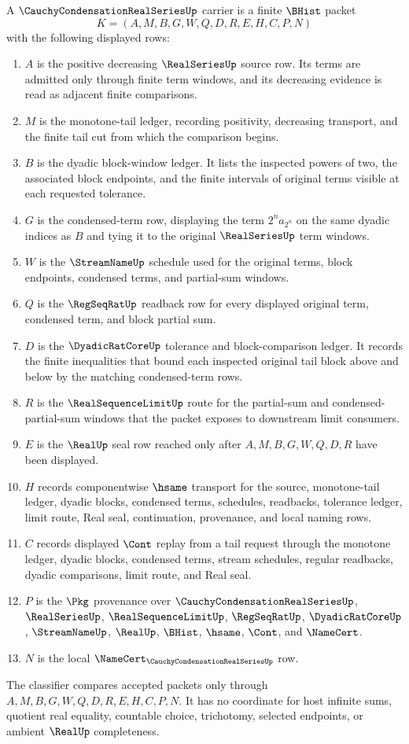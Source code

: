 \begin{definition}
\label{def:cauchy-condensation-real-series-carrier}
A $\CauchyCondensationRealSeriesUp$ carrier is a finite $\BHist$ packet
$$
K=(A,M,B,G,W,Q,D,R,E,H,C,P,N)
$$
with the following displayed rows:
\begin{enumerate}
\item $A$ is the positive decreasing $\RealSeriesUp$ source row. Its terms are admitted only through finite term windows, and its decreasing evidence is read as adjacent finite comparisons.
\item $M$ is the monotone-tail ledger, recording positivity, decreasing transport, and the finite tail cut from which the comparison begins.
\item $B$ is the dyadic block-window ledger. It lists the inspected powers of two, the associated block endpoints, and the finite intervals of original terms visible at each requested tolerance.
\item $G$ is the condensed-term row, displaying the term $2^n a_{2^n}$ on the same dyadic indices as $B$ and tying it to the original $\RealSeriesUp$ term windows.
\item $W$ is the $\StreamNameUp$ schedule used for the original terms, block endpoints, condensed terms, and partial-sum windows.
\item $Q$ is the $\RegSeqRatUp$ readback row for every displayed original term, condensed term, and block partial sum.
\item $D$ is the $\DyadicRatCoreUp$ tolerance and block-comparison ledger. It records the finite inequalities that bound each inspected original tail block above and below by the matching condensed-term rows.
\item $R$ is the $\RealSequenceLimitUp$ route for the partial-sum and condensed-partial-sum windows that the packet exposes to downstream limit consumers.
\item $E$ is the $\RealUp$ seal row reached only after $A,M,B,G,W,Q,D,R$ have been displayed.
\item $H$ records componentwise $\hsame$ transport for the source, monotone-tail ledger, dyadic blocks, condensed terms, schedules, readbacks, tolerance ledger, limit route, Real seal, continuation, provenance, and local naming rows.
\item $C$ records displayed $\Cont$ replay from a tail request through the monotone ledger, dyadic blocks, condensed terms, stream schedules, regular readbacks, dyadic comparisons, limit route, and Real seal.
\item $P$ is the $\Pkg$ provenance over $\CauchyCondensationRealSeriesUp$, $\RealSeriesUp$, $\RealSequenceLimitUp$, $\RegSeqRatUp$, $\DyadicRatCoreUp$, $\StreamNameUp$, $\RealUp$, $\BHist$, $\hsame$, $\Cont$, and $\NameCert$.
\item $N$ is the local $\NameCert_{\CauchyCondensationRealSeriesUp}$ row.
\end{enumerate}
The classifier compares accepted packets only through $A,M,B,G,W,Q,D,R,E,H,C,P,N$. It has no coordinate for host infinite sums, quotient real equality, countable choice, trichotomy, selected endpoints, or ambient $\RealUp$ completeness.
\end{definition}
